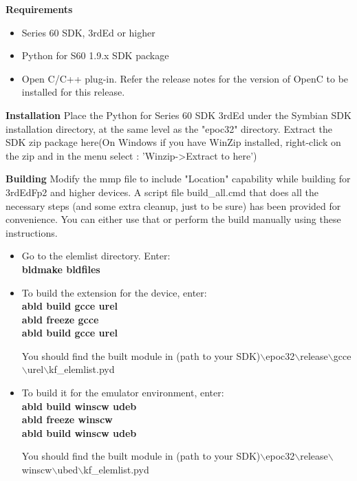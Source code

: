 {\bf Requirements} \break
\begin{itemize}
\item Series 60 SDK, 3rdEd or higher
\item Python for S60 1.9.x SDK package
\item Open C/C++ plug-in. Refer the release notes for the version of OpenC to be
      installed for this release.
\end{itemize}

{\bf Installation} \break
Place the Python for Series 60 SDK 3rdEd under the Symbian SDK installation
directory, at the same level as the "epoc32" directory. Extract the SDK zip
package here(On Windows if you have WinZip installed, right-click on the zip
and in the menu select : 'Winzip->Extract to here')

{\bf Building} \break
Modify the mmp file to include "Location" capability while building for 3rdEdFp2
and higher devices. A script file build_all.cmd that does all the necessary
steps (and some extra cleanup, just to be sure) has been provided for
convenience. You can either use that or perform the build manually using these
instructions.

\begin{itemize}
\item Go to the elemlist directory. Enter:\\ {\bf bldmake bldfiles}

\item To build the extension for the device, enter: \\
{\bf abld build gcce urel\\
     abld freeze gcce\\
     abld build gcce urel\\}

You should find the built module in (path to your SDK)$\backslash$epoc32$\backslash$release$\backslash$gcce$\backslash$urel$\backslash$kf_elemlist.pyd

\item To build it for the emulator environment, enter: \\
{\bf abld build winscw udeb\\
     abld freeze winscw\\
     abld build winscw udeb\\}

You should find the built module in (path to your SDK)$\backslash$epoc32$\backslash$release$\backslash$winscw$\backslash$ubed$\backslash$kf_elemlist.pyd
\end{itemize}

